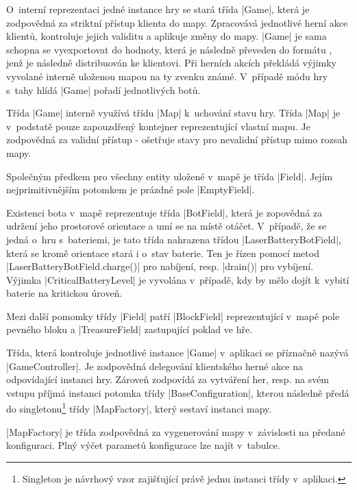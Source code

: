 O~interní reprezentaci jedné instance hry se stará třída \ic|Game|, která je zodpovědná za striktní přístup klienta do mapy. Zpracovává jednotlivé herní akce klientů, kontroluje jejich validitu a aplikuje změny do mapy. \ic|Game| je sama schopna se vyexportovat do hodnoty, která je následně převeden do formátu , jenž je následně distribuován ke klientovi. Při herních akcích překládá výjimky vyvolané interně uloženou mapou na ty zvenku známé. V~případě módu hry s~tahy hlídá \ic|Game| pořadí jednotlivých botů.

Třída \ic|Game| interně využívá třídu \ic|Map| k~uchování stavu hry. Třída \ic|Map| je v~podstatě pouze zapouzdřený kontejner reprezentující vlastní mapu. Je zodpovědná za validní přístup - ošetřuje stavy pro nevalidní přístup mimo rozsah mapy.

Společným předkem pro všechny entity uložené v~mapě je třída \ic|Field|. Jejím nejprimitivnějším potomkem je prázdné pole \ic|EmptyField|.

\begin{sloppypar}
	Existenci bota v~mapě reprezentuje třída \ic|BotField|, která je zopovědná za udržení jeho prostorové orientace a umí se na místě otáčet. V~případě, že se jedná o~hru s~bateriemi, je tato třída nahrazena třídou \ic|LaserBatteryBotField|, která se kromě orientace stará i o~stav baterie. Ten je řízen pomocí metod \ic|LaserBatteryBotField.charge()| pro nabíjení, resp. \ic|drain()| pro vybíjení. Výjimka \ic|CriticalBatteryLevel| je vyvolána v~případě, kdy by mělo dojít k~vybití baterie na kritickou úroveň.
\end{sloppypar}

Mezi další pomomky třídy \ic|Field| patří \ic|BlockField| reprezentující v~mapě pole pevného bloku a \ic|TreasureField| zastupující poklad ve hře.

Třída, která kontroluje jednotlivé instance \ic|Game| v~aplikaci se příznačně nazývá \ic|GameController|. Je zodpovědná delegování klientského herné akce na odpovídající instanci hry. Zároveň zodpovídá za vytváření her, resp. na svém vstupu příjmá instanci potomka třídy \ic|BaseConfiguration|, kterou následně předá do singletonu\footnote{Singleton je návrhový vzor zajišťující právě jednu instanci třídy v~aplikaci.} třídy \ic|MapFactory|, který sestaví instanci mapy.

\ic|MapFactory| je třída zodpovědná za vygenerování mapy v~závislosti na předané konfiguraci. Plný výčet parametů konfigurace lze najít v~tabulce.

